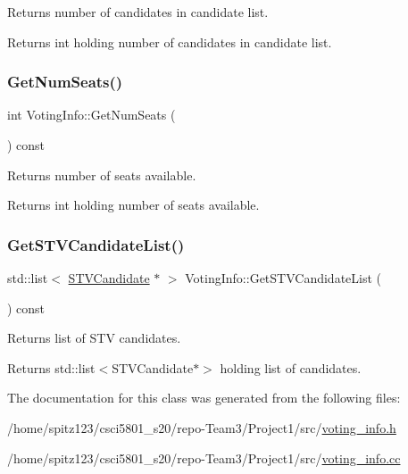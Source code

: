 Returns number of candidates in candidate list. 

\begin{DoxyReturn}{Returns}
int holding number of candidates in candidate list. 
\end{DoxyReturn}
\mbox{\label{classVotingInfo_a9c226e3b169e0228ab26cb0a251792bd}} 
\subsubsection{\texorpdfstring{Get\+Num\+Seats()}{GetNumSeats()}}
{\footnotesize\ttfamily int Voting\+Info\+::\+Get\+Num\+Seats (\begin{DoxyParamCaption}{ }\end{DoxyParamCaption}) const}



Returns number of seats available. 

\begin{DoxyReturn}{Returns}
int holding number of seats available. 
\end{DoxyReturn}
\mbox{\label{classVotingInfo_a16f743613daad52be36a92226001e5dd}} 
\subsubsection{\texorpdfstring{Get\+S\+T\+V\+Candidate\+List()}{GetSTVCandidateList()}}
{\footnotesize\ttfamily std\+::list$<$ \hyperlink{classSTVCandidate}{S\+T\+V\+Candidate} $\ast$ $>$ Voting\+Info\+::\+Get\+S\+T\+V\+Candidate\+List (\begin{DoxyParamCaption}{ }\end{DoxyParamCaption}) const}



Returns list of S\+TV candidates. 

\begin{DoxyReturn}{Returns}
std\+::list$<$\+S\+T\+V\+Candidate$\ast$$>$ holding list of candidates. 
\end{DoxyReturn}


The documentation for this class was generated from the following files\+:\begin{DoxyCompactItemize}
\item 
/home/spitz123/csci5801\+\_\+s20/repo-\/\+Team3/\+Project1/src/\hyperlink{voting__info_8h}{voting\+\_\+info.\+h}\item 
/home/spitz123/csci5801\+\_\+s20/repo-\/\+Team3/\+Project1/src/\hyperlink{voting__info_8cc}{voting\+\_\+info.\+cc}\end{DoxyCompactItemize}
